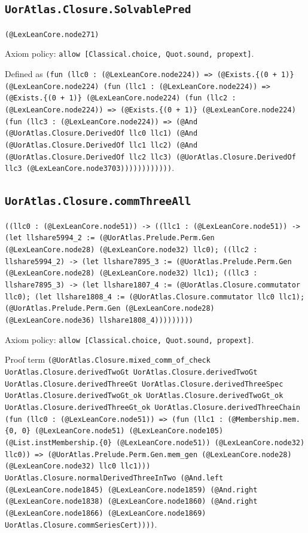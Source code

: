 \documentclass[11pt]{article}
\begin{document}
\subsection*{\texttt{UorAtlas.Closure.SolvablePred}}
\noindent\texttt{(@LexLeanCore.node271)}\par
\noindent Axiom policy: \texttt{allow [Classical.choice, Quot.sound, propext]}.\par
\noindent Defined as \texttt{(fun (llc0 : (@LexLeanCore.node224)) => (@Exists.\{(0 + 1)\} (@LexLeanCore.node224) (fun (llc1 : (@LexLeanCore.node224)) => (@Exists.\{(0 + 1)\} (@LexLeanCore.node224) (fun (llc2 : (@LexLeanCore.node224)) => (@Exists.\{(0 + 1)\} (@LexLeanCore.node224) (fun (llc3 : (@LexLeanCore.node224)) => (@And (@UorAtlas.Closure.DerivedOf llc0 llc1) (@And (@UorAtlas.Closure.DerivedOf llc1 llc2) (@And (@UorAtlas.Closure.DerivedOf llc2 llc3) (@UorAtlas.Closure.DerivedOf llc3 (@LexLeanCore.node3703))))))))))))}.\par
\subsection*{\texttt{UorAtlas.Closure.commThreeAll}}
\noindent\texttt{((llc0 : (@LexLeanCore.node51)) -> ((llc1 : (@LexLeanCore.node51)) -> (let llshare5994\_2 := (@UorAtlas.Prelude.Perm.Gen (@LexLeanCore.node28) (@LexLeanCore.node32) llc0); ((llc2 : llshare5994\_2) -> (let llshare7895\_3 := (@UorAtlas.Prelude.Perm.Gen (@LexLeanCore.node28) (@LexLeanCore.node32) llc1); ((llc3 : llshare7895\_3) -> (let llshare1807\_4 := (@UorAtlas.Closure.commutator llc0); (let llshare1808\_4 := (@UorAtlas.Closure.commutator llc0 llc1); (@UorAtlas.Prelude.Perm.Gen (@LexLeanCore.node28) (@LexLeanCore.node36) llshare1808\_4)))))))))}\par
\noindent Axiom policy: \texttt{allow [Classical.choice, Quot.sound, propext]}.\par
\noindent Proof term \texttt{(@UorAtlas.Closure.mixed\_comm\_of\_check UorAtlas.Closure.derivedTwoGt UorAtlas.Closure.derivedTwoGt UorAtlas.Closure.derivedThreeGt UorAtlas.Closure.derivedThreeSpec UorAtlas.Closure.derivedTwoGt\_ok UorAtlas.Closure.derivedTwoGt\_ok UorAtlas.Closure.derivedThreeGt\_ok UorAtlas.Closure.derivedThreeChain (fun (llc0 : (@LexLeanCore.node51)) => (fun (llc1 : (@Membership.mem.\{0, 0\} (@LexLeanCore.node51) (@LexLeanCore.node105) (@List.instMembership.\{0\} (@LexLeanCore.node51)) (@LexLeanCore.node32) llc0)) => (@UorAtlas.Prelude.Perm.Gen.mem\_gen (@LexLeanCore.node28) (@LexLeanCore.node32) llc0 llc1))) UorAtlas.Closure.normalDerivedThreeInTwo (@And.left (@LexLeanCore.node1845) (@LexLeanCore.node1859) (@And.right (@LexLeanCore.node1838) (@LexLeanCore.node1860) (@And.right (@LexLeanCore.node1866) (@LexLeanCore.node1869) UorAtlas.Closure.commSeriesCert))))}.\par
\end{document}
